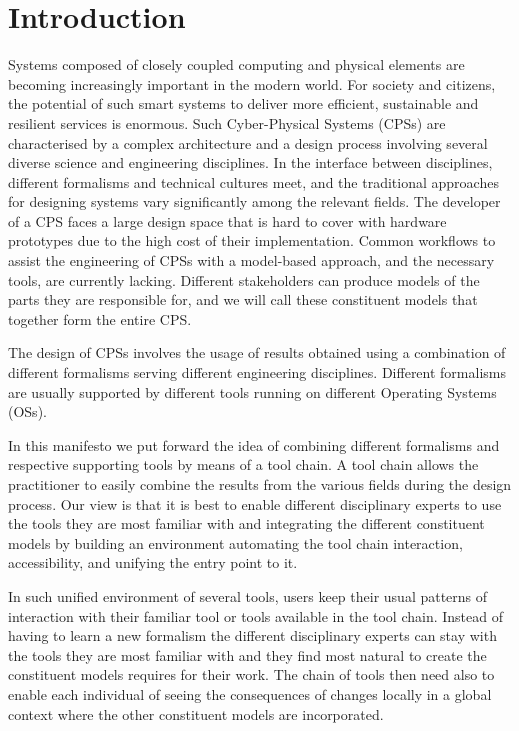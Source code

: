 
\section{Introduction}\label{sec:intro}


Systems composed of closely coupled computing and physical elements are becoming increasingly important in the modern world. For society and citizens, the potential of such smart systems to deliver more efficient, sustainable and resilient services is enormous.  Such Cyber-Physical Systems (CPSs) are characterised by a complex architecture and a design process involving several diverse science and engineering disciplines. In the interface between disciplines, different formalisms and technical cultures meet, and the traditional approaches for designing systems vary significantly among the relevant fields. The developer of a CPS faces a large design space that is hard to cover with hardware prototypes due to the high cost of their implementation. Common workflows to assist the engineering of CPSs with a model-based approach, and the necessary tools, are currently lacking. Different stakeholders can produce models of the parts they are responsible for, and we will call these constituent models that together form the entire CPS. 

The design of CPSs involves the usage of results obtained
using a combination of different formalisms serving different engineering
disciplines. Different formalisms are usually
supported by different tools running on different Operating Systems (OSs). 

In this manifesto we put forward the idea of combining different formalisms and
respective supporting tools by means of a tool chain. A tool chain allows the
practitioner to easily combine the results from the various fields during the
design process.  Our view is that it is best to enable different disciplinary experts to use the tools they are most familiar with and
integrating the different constituent models by building an environment automating the tool chain
interaction, accessibility, and unifying the entry point to it. 

In such unified environment of several tools, users keep their usual patterns
of interaction with their familiar tool or tools available in the tool chain.
Instead of having to learn a new formalism the different disciplinary experts can stay with the tools they are most familiar with and they find most natural to create the constituent models requires for their work.  The chain of tools then need also to enable each individual of seeing the consequences of changes locally in a global context where the other constituent models are incorporated.

